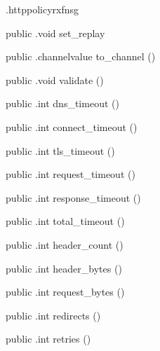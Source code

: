 \begin{CrexxClass}{.httppolicy}{rxfnsg}
\begin{Members}
    \Method
      {public}
      {.void}
      {set\_replay}
      {}

    \Method
      {public}
      {.channelvalue}
      {to\_channel}
      {()}

    \Method
      {public}
      {.void}
      {validate}
      {()}

    \Method
      {public}
      {.int}
      {dns\_timeout}
      {()}

    \Method
      {public}
      {.int}
      {connect\_timeout}
      {()}

    \Method
      {public}
      {.int}
      {tls\_timeout}
      {()}

    \Method
      {public}
      {.int}
      {request\_timeout}
      {()}

    \Method
      {public}
      {.int}
      {response\_timeout}
      {()}

    \Method
      {public}
      {.int}
      {total\_timeout}
      {()}

    \Method
      {public}
      {.int}
      {header\_count}
      {()}

    \Method
      {public}
      {.int}
      {header\_bytes}
      {()}

    \Method
      {public}
      {.int}
      {request\_bytes}
      {()}

    \Method
      {public}
      {.int}
      {redirects}
      {()}

    \Method
      {public}
      {.int}
      {retries}
      {()}

  \end{Members}
\end{CrexxClass}

